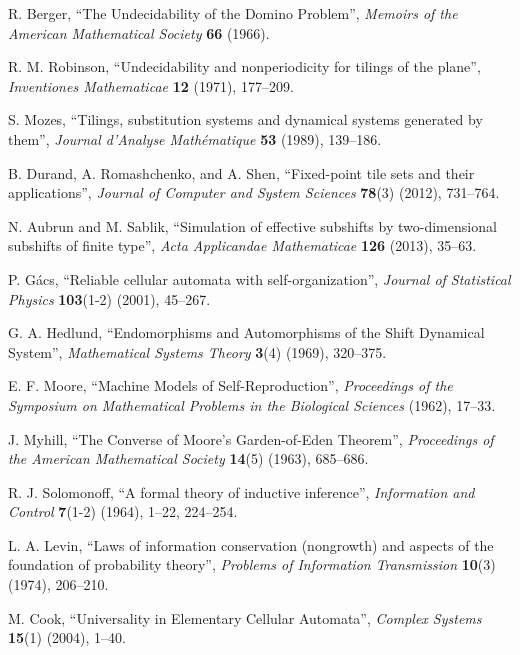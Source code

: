 \documentclass[12pt]{article}
\theoremstyle{plain}
\theoremstyle{definition}
\begin{document}

\begin{thebibliography}{99}

 R. Berger, ``The Undecidability of the Domino Problem'', \emph{Memoirs of the American Mathematical Society} \textbf{66} (1966).

 R. M. Robinson, ``Undecidability and nonperiodicity for tilings of the plane'', \emph{Inventiones Mathematicae} \textbf{12} (1971), 177--209.

 S. Mozes, ``Tilings, substitution systems and dynamical systems generated by them'', \emph{Journal d'Analyse Math\'{e}matique} \textbf{53} (1989), 139--186.

 B. Durand, A. Romashchenko, and A. Shen, ``Fixed-point tile sets and their applications'', \emph{Journal of Computer and System Sciences} \textbf{78}(3) (2012), 731--764.

 N. Aubrun and M. Sablik, ``Simulation of effective subshifts by two-dimensional subshifts of finite type'', \emph{Acta Applicandae Mathematicae} \textbf{126} (2013), 35--63.

 P. G\'{a}cs, ``Reliable cellular automata with self-organization'', \emph{Journal of Statistical Physics} \textbf{103}(1-2) (2001), 45--267.

 G. A. Hedlund, ``Endomorphisms and Automorphisms of the Shift Dynamical System'', \emph{Mathematical Systems Theory} \textbf{3}(4) (1969), 320--375.

 E. F. Moore, ``Machine Models of Self-Reproduction'', \emph{Proceedings of the Symposium on Mathematical Problems in the Biological Sciences} (1962), 17--33.

 J. Myhill, ``The Converse of Moore's Garden-of-Eden Theorem'', \emph{Proceedings of the American Mathematical Society} \textbf{14}(5) (1963), 685--686.

 R. J. Solomonoff, ``A formal theory of inductive inference'', \emph{Information and Control} \textbf{7}(1-2) (1964), 1--22, 224--254.

 L. A. Levin, ``Laws of information conservation (nongrowth) and aspects of the foundation of probability theory'', \emph{Problems of Information Transmission} \textbf{10}(3) (1974), 206--210.

 M. Cook, ``Universality in Elementary Cellular Automata'', \emph{Complex Systems} \textbf{15}(1) (2004), 1--40.


\end{thebibliography}
\end{document}
